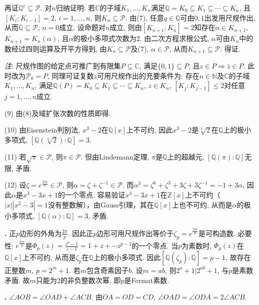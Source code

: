 \par 再证$\mathbb{Q}^c \subseteq \mathcal{P}$. 对$n$归纳证明: 若$\mathbb{C}$的子域$K_1,\dots,K_n$满足$\mathbb{Q}=K_0 \subseteq K_1 \subseteq \cdots \subseteq K_n$, 且$[K_i:K_{i-1}]=2$, $i=1,\dots,n$, 则$K_n \subseteq \mathcal{P}$. 由(7), 任意$q\in \mathbb{Q}$可由$0,1$出发用尺规作出, 从而$\mathbb{Q}\subseteq \mathcal{P}$, $n=0$成立. 设命题对$n$成立, 则由$[K_{n+1}:K_n]=2$知存在$\alpha\in K_{n+1}$, $K_{n+1} = K_n(\alpha)$, 且$\alpha$的极小多项式次数为2. 由二次方程求根公式, $\alpha$可由$K_n$中的数经过四则运算及开平方得到, 由$K_n \subseteq \mathcal{P}$及(7), $\alpha\in \mathcal{P}$, 从而$K_{n+1}\subseteq \mathcal{P}$. 得证. 

\emph{注}: 尺规作图的给定点可推广到有限集$P\subseteq \mathbb{C}$, 满足$\{0,1\} \subseteq P$, 且$z\in P\Rightarrow \bar{z} \in P$. 此时改为$\mathcal{P}_0=P$, 同理可证复数$z$可用尺规作出的充要条件为: 存在$n\in \mathbb{N}$及$\mathbb{C}$的子域$K_1,\dots,K_n$, 满足$\mathbb{Q}(P) = K_0 \subseteq K_1 \subseteq \cdots \subseteq K_n$, $z\in K_n$, $[K_j:K_{j-1}]\le 2$对任意$j=1,\dots,n$成立. 

(9) 由(8)及域扩张次数的性质即得. 

(10) 由Eisenstein判别法, $x^3-2$在$\mathbb{Q}[x]$上不可约, 因此$x^3-2$是$\sqrt[3]{2}$在$\mathbb{Q}$上的极小多项式, $[\mathbb{Q}(\sqrt[3]{2}): \mathbb{Q}]=3$. 

(11) 若$\sqrt{\pi}\in \mathcal{P}$, 则$\pi \in \mathcal{P}$. 但由Lindemann定理, $\pi$是$\mathbb{Q}$上的超越元, $[\mathbb{Q}(\pi):\mathbb{Q}]$无限, 矛盾. 

(12) 设$\zeta=e^{\frac{2\pi i}{9}}\in \mathcal{P}$, 则$\alpha = \zeta + \zeta^{-1} \in \mathcal{P}$. 而$\alpha^3 = \zeta^6 + \zeta^3 + 3\zeta + 3\zeta^{-1} = -1 + 3\alpha$, 因此$\alpha$是$x^3-3x+1$的一个零点. 容易验证$x^3-3x+1$在$\mathbb{Z}[x]$上不可约（$|x||x^2-3|=1$没有整数解），由Gauss引理，其在$\mathbb{Q}[x]$上也不可约, 从而是$\alpha$的极小多项式, $[\mathbb{Q}(\alpha):\mathbb{Q}]=3$, 矛盾. 

\par \textbf{\thesolplg .} 正$p$边形的外角为$\frac{2\pi}{p}$. 因此正$p$边形可用尺规作出等价于$\zeta_p=e^{\frac{2\pi i}{p}}$是可构造数. 必要性: $e^{\frac{2\pi i}{p}}$是$\Phi_p(z)=\frac{z^{p}-1}{z-1}=1+z+\cdots z^{p-1}$的一个零点. 当$p$为素数时, $\Phi_p(z)$在$\mathbb{Q}[x]$上不可约, 从而是$\zeta_p$在$\mathbb{Q}$上的极小多项式. 因此$[\mathbb{Q}(\zeta_p):\mathbb{Q}]=p-1$, 故存在正整数$m$, $p=2^m+1$. 若$m$包含奇素因子$b$, 设$m=ab$, 则$2^a+1\vert 2^{ab}+1$, 与$p$是素数矛盾. 故$m$只能为2的非负整数次幂, 即$p$是Fermat素数. 

\par \textbf{\thesolplg .} $\angle AOB=\angle OAD +\angle ACB$. 由$OA=OD=CD$, $\angle OAD = \angle ODA = 2\angle ACB$.  